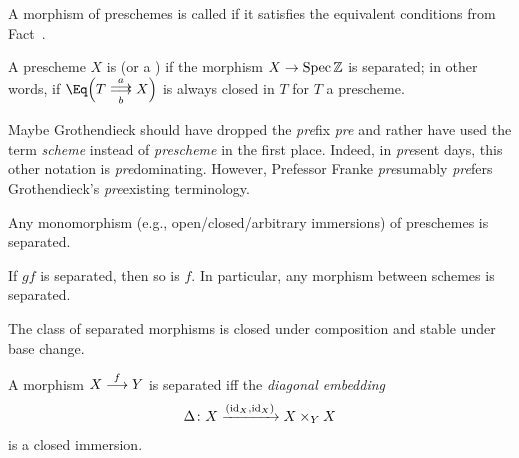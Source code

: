 \documentclass[a4paper,parskip=half,numbers=enddot, DIV=12]{scrreprt}
\begin{document}
\begin{defi}
	\begin{alphanumerate}
		\item {} A morphism of preschemes is called  if it satisfies the equivalent conditions from Fact~.
		\item A prescheme $X$ is  (or a ) if the morphism $X\morphism\Spec \IZ$ is separated; in other words, if $\Eq\Big(T\doublemorphism[a][b]X\Big)$ is always closed in $T$ for $T$ a prescheme.
	\end{alphanumerate}
\end{defi}
\begin{rem*}
	Maybe Grothendieck should have dropped the \emph{pre}fix \emph{pre} and rather have used the term \emph{scheme} instead of \emph{prescheme} in the first place. Indeed, in \emph{pre}sent days, this other notation is \emph{pre}dominating. However, Prefessor Franke \emph{pre}sumably \emph{pre}fers Grothendieck's \emph{pre}existing terminology.
\end{rem*}
\begin{fact}
	\begin{alphanumerate}
		\item {} Any monomorphism (e.g., open/closed/arbitrary immersions) of preschemes is separated.
		\item If $gf$ is separated, then so is $f$. In particular, any morphism between schemes is separated.
		\item The class of separated morphisms is closed under composition and stable under base change.
		\item A morphism $X\morphism[f]Y$ is separated iff the \emph{diagonal embedding} 
		\begin{align*}
			\Delta\colon X\xrightarrow{(\operatorname{id}_X,\operatorname{id}_X)}X\times_YX
		\end{align*}
		is a closed immersion.
	\end{alphanumerate}
\end{fact}
\end{document}
